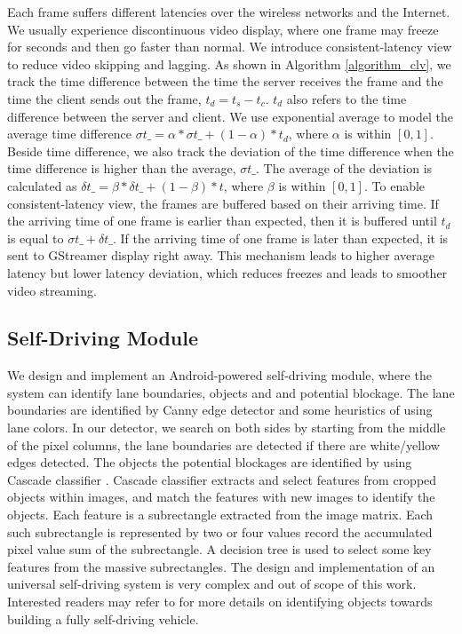 Each frame suffers different latencies over the wireless 
networks and the Internet. 
We usually experience discontinuous video display, 
where one frame may freeze for seconds and then go
faster than normal. 
We introduce consistent-latency view to
reduce video skipping and lagging. 
As shown in Algorithm \ref{algorithm_clv}, we track the time difference between 
the time the server receives the frame 
and the time the client sends out
the frame, $t_d = t_s - t_c$. 
$t_d$ also refers to the time difference between the server and client.
We use exponential average to model the average time 
difference $\sigma{t}\_ = \alpha * \sigma{t}\_ + (1 - \alpha) * t_d$, 
where $\alpha$ is within $[0, 1]$. 
Beside time difference, we also track the deviation 
of the time difference when the time difference is 
higher than the average, $\sigma{t}\_$. 
The average of the deviation is calculated as
$\delta{t}\_ = \beta * \delta{t}\_ + (1 - \beta) * t$, 
where $\beta$ is within $[0, 1]$.
To enable consistent-latency view, the frames are buffered based
on their arriving time. 
If the arriving time of one frame is earlier than expected, 
then it is buffered until $t_d$ is equal to $\sigma{t}\_ + \delta{t}\_$. 
If the arriving time of one frame is later than expected, 
it is sent to GStreamer display right away. 
This mechanism leads to higher average latency but 
lower latency deviation,
which reduces freezes and leads to smoother video streaming. 


\subsection{Self-Driving Module}

We design and implement an Android-powered self-driving module, 
where the system can identify lane boundaries, objects and
and potential blockage. 
The lane boundaries are identified by Canny edge detector
\cite{canny1987computational} and some heuristics of 
using lane colors. 
In our detector, we search on both sides by starting from the 
middle of the pixel columns, the lane boundaries are detected if there are
white/yellow edges detected.
The objects the potential blockages are identified by using
Cascade classifier \cite{viola2001rapid}. 
Cascade classifier extracts and select features from cropped objects within images, 
and match the features with new images to identify the objects.    
Each feature is a subrectangle extracted from the image matrix. 
Each such subrectangle is represented by two or four values record 
the accumulated pixel value sum of the subrectangle.
A decision tree is used to select some key features from the massive
subrectangles. 
The design and implementation of an universal self-driving system is very
complex and out of scope of this work. 
Interested readers may refer to \cite{waymo, canny1987computational, viola2001rapid} for more
details on identifying objects towards building a fully self-driving vehicle. 

